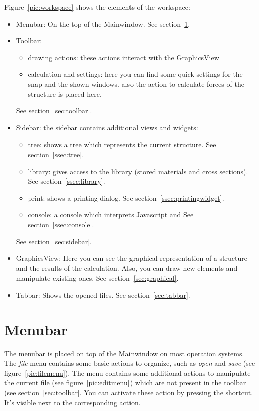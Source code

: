 \documentclass[a4paper,11pt]{report}
\begin{document}
Figure~\ref{pic:workspace} shows the elements of the workspace:
\begin{itemize}
	\item Menubar: On the top of the Mainwindow. See section~\ref{sec:menubar}.
	\item Toolbar: 
	\begin{itemize}
		\item drawing actions: these actions interact with the GraphicsView
		\item calculation and settings: here you can find some quick settings for the snap and the shown windows. also the action to calculate forces of the structure is placed here.
	\end{itemize}
	See section~\ref{sec:toolbar}.
	\item Sidebar: the sidebar contains additional views and widgets:
	\begin{itemize}
		\item tree: shows a tree which represents the current structure. See section~\ref{ssec:tree}.
		\item library: gives access to the library (stored materials and cross sections). See section~\ref{ssec:library}.
		\item print: shows a printing dialog. See section~\ref{ssec:printingwidget}.
		\item console: a console which interprets Javascript and  See section~\ref{ssec:console}.
	\end{itemize}
	See section~\ref{sec:sidebar}.
	\item GraphicsView: Here you can see the graphical representation of a structure and the results of the calculation. Also, you can draw new elements and manipulate existing ones. See section~\ref{sec:graphical}.
	\item Tabbar: Shows the opened files. See section~\ref{sec:tabbar}.
\end{itemize}

\section{Menubar}
\label{sec:menubar}
The menubar is placed on top of the Mainwindow on most operation systems. The \textit{file} menu contains some basic actions to organize, such as \textit{open} and \textit{save} (see figure~\ref{pic:filemenu}). The  menu contains some additional actions to manipulate the current file (see figure~\ref{pic:editmenu}) which are not present in the toolbar (see section~\ref{sec:toolbar}. You can activate these action by pressing the shortcut. It's visible next to the corresponding action.
\end{document}
